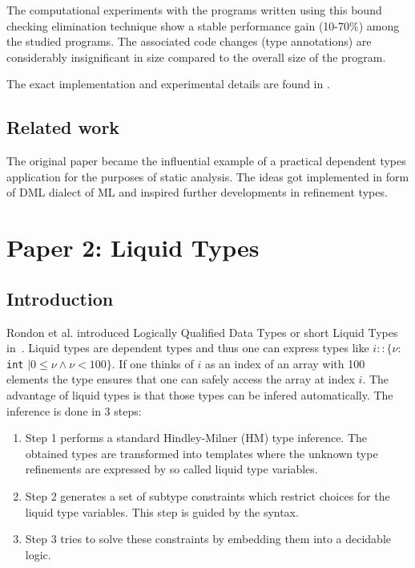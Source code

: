 \documentclass[a4paper,UKenglish]{lipics-v2016}
\begin{document}
The computational experiments with the programs written using this bound
checking elimination technique show a stable performance gain (10-70\%) among
the studied programs. The associated code changes (type annotations) are
considerably insignificant in size compared to the overall size of the program.

The exact implementation and experimental details are found in \cite{Xi:1998}.

\subsection{Related work}

The original paper became the influential example of a practical dependent
types application for the purposes of static analysis. The ideas got
implemented in form of DML dialect of ML \cite{XiPhd:1998} and inspired further
developments in refinement types.

\section{Paper 2: Liquid Types}

\subsection{Introduction}

Rondon et al. introduced Logically Qualified Data Types or short Liquid Types in~\cite{Rondon:2008:LT}.
Liquid types are dependent types and thus one can express types like $i:: \{\nu:$ \lstinline{int} $\mid 0 \le \nu \land \nu < 100\}$.
If one thinks of $i$ as an index of an array with 100 elements the type ensures that one can safely access the array at index $i$.
The advantage of liquid types is that those types can be infered automatically.
The inference is done in 3 steps:
\begin{enumerate}
    \item Step 1 performs a standard Hindley-Milner (HM) type inference.
        The obtained types are transformed into templates where the unknown type refinements are expressed by so called liquid type variables.
    \item Step 2 generates a set of subtype constraints which restrict choices for the liquid type variables.
        This step is guided by the syntax.
    \item Step 3 tries to solve these constraints by embedding them into a decidable logic.
\end{enumerate}
\end{document}
